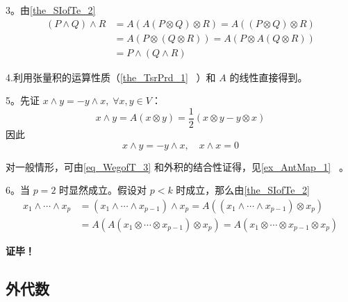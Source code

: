 3。由\autoref{the_SIofTe_2}~
\begin{equation}
\begin{aligned}
(P\wedge Q)\wedge R&=A(A(P\otimes Q)\otimes R)=A((P\otimes Q)\otimes R)\\
&=A(P\otimes (Q\otimes R))=A(P\otimes A(Q\otimes R))\\
&=P\wedge (Q\wedge R)
\end{aligned}
\end{equation}

4.利用张量积的运算性质（\autoref{the_TsrPrd_1}~ ）和 $A$ 的线性直接得到。

5。先证 $x\wedge y=-y\wedge x,\;\forall x,y\in V$：
\begin{equation}
x\wedge y=A(x\otimes y)=\frac{1}{2}(x\otimes y-y\otimes x)
\end{equation}
因此
\begin{equation}\label{eq_WegofT_3}
x\wedge y=-y\wedge x,\quad x\wedge x=0
\end{equation}

对一般情形，可由\autoref{eq_WegofT_3} 和外积的结合性证得，见\autoref{ex_AntMap_1}~ 。

6。当 $p=2$ 时显然成立。假设对 $p<k$ 时成立，那么由\autoref{the_SIofTe_2}~
\begin{equation}
\begin{aligned}
x_1\wedge\cdots\wedge x_p&=(x_1\wedge\cdots\wedge x_{p-1})\wedge x_p=A((x_1\wedge\cdots\wedge x_{p-1})\otimes x_p)\\
&=A(A(x_1\otimes\cdots\otimes x_{p-1})\otimes x_p)=A(x_1\otimes\cdots\otimes x_{p-1}\otimes x_p)
\end{aligned}
\end{equation}

\textbf{证毕！}

\subsection{外代数}

